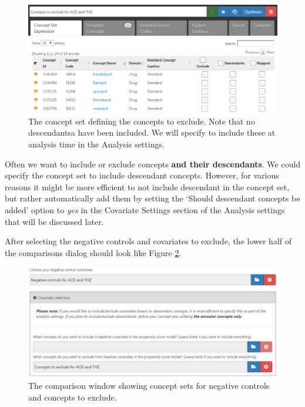 \documentclass[]{book}
\begin{document}
\begin{figure}

{\centering \includegraphics[width=1\linewidth]{images/PopulationLevelEstimation/covsToExclude} 

}

\caption{The concept set defining the concepts to exclude. Note that no descendantsa have been included. We will specify to include these at analysis time in the Analysis settings.}\label{fig:covsToExclude}
\end{figure}

Often we want to include or exclude concepts \textbf{and their
descendants}. We could specify the concept set to include descendant
concepts. However, for various reasons it might be more efficient to not
include descendant in the concept set, but rather automatically add them
by setting the `Should descendant concepts be added' option to
\emph{yes} in the Covariate Settings section of the Analysis settings
that will be discussed later.

After selecting the negative controls and covariates to exclude, the
lower half of the comparisons dialog should look like Figure
\ref{fig:comparisons2}.

\begin{figure}

{\centering \includegraphics[width=1\linewidth]{images/PopulationLevelEstimation/comparisons2} 

}

\caption{The comparison window showing concept sets for negative controls and concepts to exclude.}\label{fig:comparisons2}
\end{figure}
\end{document}
